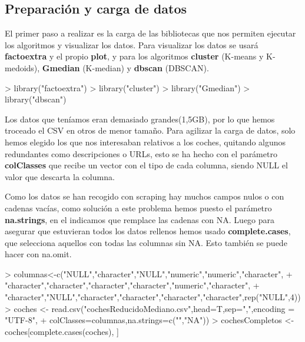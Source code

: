 \documentclass[a4paper]{article}
\begin{document}
\subsection{Preparación y carga de datos} El primer paso a realizar es la carga de las bibliotecas que nos permiten ejecutar los algoritmos y visualizar los datos. Para visualizar los datos se usará \textbf{factoextra} y el propio \textbf{plot}, y para los algoritmos \textbf{cluster} (K-means y K-medoids), \textbf{Gmedian} (K-median) y \textbf{dbscan} (DBSCAN).

\begin{Schunk}
\begin{Sinput}
> library("factoextra")
> library("cluster")
> library("Gmedian")
> library("dbscan")
\end{Sinput}
\end{Schunk}

Los datos que teníamos eran demasiado grandes(1,5GB), por lo que hemos troceado el CSV en otros de menor tamaño. Para agilizar la carga de datos, solo hemos elegido los que nos interesaban relativos a los coches, quitando algunos redundantes como descripciones o URLs, esto se ha hecho con el parámetro \textbf{colClasses} que recibe un vector con el tipo de cada columna, siendo NULL el valor que descarta la columna.    

Como los datos se han recogido con scraping hay muchos campos nulos o con cadenas vacías, como solución a este problema hemos puesto el parámetro \textbf{na.strings}, en el indicamos que remplace las cadenas con NA. Luego para asegurar que estuvieran todos los datos rellenos hemos usado \textbf{complete.cases}, que selecciona aquellos con todas las columnas sin NA. Esto también se puede hacer con na.omit. 
\begin{Schunk}
\begin{Sinput}
> columnas<-c("NULL","character","NULL","numeric","numeric","character",
+ "character","character","character","character","numeric","character",
+ "character","NULL","character","character","character","character",rep("NULL",4))
> coches <- read.csv("cochesReducidoMediano.csv",head=T,sep=",",encoding = "UTF-8",
+           colClasses=columnas,na.strings=c("","NA"))
> cochesCompletos <-coches[complete.cases(coches), ]
\end{Sinput}
\end{Schunk}
\end{document}
